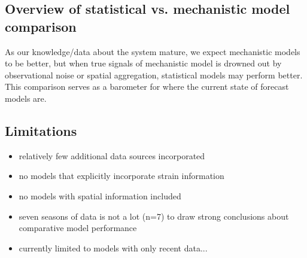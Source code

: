 \documentclass{article}
\begin{document}
\subsection{Overview of statistical vs. mechanistic model comparison}
As our knowledge/data about the system mature, we expect mechanistic models to be better, but when true signals of mechanistic model is drowned out by observational noise or spatial aggregation, statistical models may perform better. This comparison serves as a barometer for where the current state of forecast models are.

\subsection{Limitations}

\begin{itemize}
    \item relatively few additional data sources incorporated
    \item no models that explicitly incorporate strain information
    \item no models with spatial information included
    \item seven seasons of data is not a lot (n=7) to draw strong conclusions about comparative model performance
    \item currently limited to models with only recent data...
\end{itemize}



\end{document}
